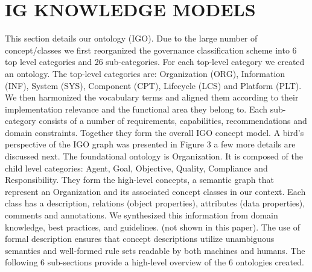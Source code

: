 \documentclass[a4paper,twoside]{article}
\begin{document}
\section{\uppercase{IG Knowledge Models}}
This section details our ontology (IGO). Due to the large number of concept/classes we first reorganized the governance classification scheme into 6 top level categories and 26 sub-categories. For each top-level category we created an ontology. 
The top-level categories are: Organization (ORG), Information (INF), System (SYS), Component (CPT), Lifecycle (LCS) and Platform (PLT). We then harmonized the vocabulary terms and aligned them according to their implementation relevance and the functional area they belong to. Each sub-category consists of a number of requirements, capabilities, recommendations and domain constraints. Together they form the overall IGO concept model. A bird’s perspective of the IGO graph was presented in Figure 3 a few more details are discussed next. 
The foundational ontology is Organization. It is composed of the child level categories: Agent, Goal, Objective, Quality, Compliance and Responsibility. They form the high-level concepts, a semantic graph that represent an Organization and its associated concept classes in our context.  Each class has a description, relations (object properties), attributes (data properties), comments and annotations. We synthesized this information from domain knowledge, best practices, and guidelines. (not shown in this paper). The use of formal description ensures that concept descriptions utilize unambiguous semantics and well-formed rule sets readable by both machines and humans. The following 6 sub-sections provide a high-level overview of the 6 ontologies created.
%
\end{document}
